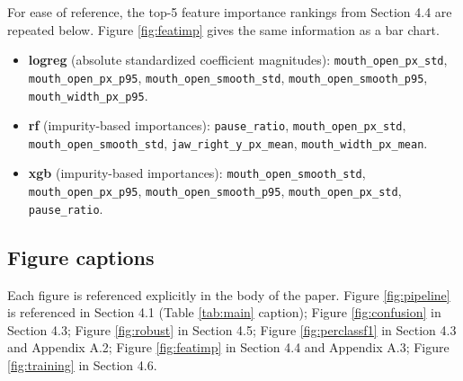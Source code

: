 \documentclass{article}
\begin{document}
For ease of reference, the top-5 feature importance rankings from Section 4.4 are repeated below. Figure \ref{fig:featimp} gives the same information as a bar chart.

\begin{itemize}
    \item \textbf{logreg} (absolute standardized coefficient magnitudes): \texttt{mouth\_open\_px\_std}, \texttt{mouth\_open\_px\_p95}, \texttt{mouth\_open\_smooth\_std}, \texttt{mouth\_open\_smooth\_p95}, \texttt{mouth\_width\_px\_p95}.
    \item \textbf{rf} (impurity-based importances): \texttt{pause\_ratio}, \texttt{mouth\_open\_px\_std}, \texttt{mouth\_open\_smooth\_std}, \texttt{jaw\_right\_y\_px\_mean}, \texttt{mouth\_width\_px\_mean}.
    \item \textbf{xgb} (impurity-based importances): \texttt{mouth\_open\_smooth\_std}, \texttt{mouth\_open\_px\_p95}, \texttt{mouth\_open\_smooth\_p95}, \texttt{mouth\_open\_px\_std}, \texttt{pause\_ratio}.
\end{itemize}

\subsection{Figure captions}

Each figure is referenced explicitly in the body of the paper. Figure \ref{fig:pipeline} is referenced in Section 4.1 (Table \ref{tab:main} caption); Figure \ref{fig:confusion} in Section 4.3; Figure \ref{fig:robust} in Section 4.5; Figure \ref{fig:perclassf1} in Section 4.3 and Appendix A.2; Figure \ref{fig:featimp} in Section 4.4 and Appendix A.3; Figure \ref{fig:training} in Section 4.6.
\end{document}
